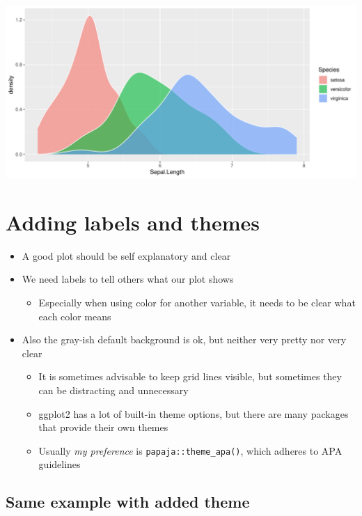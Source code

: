 \documentclass[
]{book}
\providecommand{\tightlist}{%
  \setlength{\itemsep}{0pt}\setlength{\parskip}{0pt}}
\begin{document}
\begin{flushleft}\includegraphics{_main_files/figure-latex/unnamed-chunk-52-1} \end{flushleft}

\section{Adding labels and themes}\label{adding-labels-and-themes}

\begin{itemize}
\tightlist
\item
  A good plot should be self explanatory and clear
\item
  We need labels to tell others what our plot shows

  \begin{itemize}
  \tightlist
  \item
    Especially when using color for another variable, it needs to be clear what each color means
  \end{itemize}
\item
  Also the gray-ish default background is ok, but neither very pretty nor very clear

  \begin{itemize}
  \tightlist
  \item
    It is sometimes advisable to keep grid lines visible, but sometimes they can be distracting and unnecessary
  \item
    ggplot2 has a lot of built-in theme options, but there are many packages that provide their own themes
  \item
    Usually \emph{my preference} is \texttt{papaja::theme\_apa()}, which adheres to APA guidelines
  \end{itemize}
\end{itemize}

\subsection{Same example with added theme}\label{same-example-with-added-theme}
\end{document}
